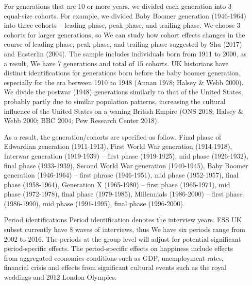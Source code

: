 For generations that are 10 or more years, we divided each generation into 3 equal-size cohorts. For example, we divided Baby Boomer generation (1946-1964) into three cohorts – leading phase, peak phase, and trailing phase. We choose 3 cohorts for larger generations, so We can study how cohort effects changes in the course of leading phase, peak phase, and trailing phase suggested by Shu (2017) and Easterlin (2004). The sample includes individuals born from 1911 to 2000, as a result, We have 7 generations and total of 15 cohorts. UK historians have distinct identifications for generations born before the baby boomer generation, especially for the era between 1910 to 1948 (Annan 1978; Halsey & Webb 2000). We divide the postwar (1948) generations similarly to that of the United States, probably partly due to similar population patterns, increasing the cultural influence of the United States on a waning British Empire (ONS 2018; Halsey & Webb 2000; BBC 2004; Pew Research Center 2018). 

As a result, the generation/cohorts are specified as follow. Final phase of Edwardian generation (1911-1913), First World War generation (1914-1918), Interwar generation (1919-1939) – first phase (1919-1925), mid phase (1926-1932), final phase (1933-1939), Second World War generation (1940-1945),  Baby Boomer generation (1946-1964) – first phrase (1946-1951), mid phase (1952-1957), final phase (1958-1964), Generation X (1965-1980) – first phase (1965-1971), mid phase (1972-1978), final phase (1979-1985), Millennials (1986-2000) – first phase (1986-1990), mid phase (1991-1995), final phase (1996-2000).

Period identifications
Period identification denotes the interview years. ESS UK subset currently have 8 waves of interviews, thus We have six periods range from 2002 to 2016. The periods at the group level will adjust for potential significant period-specific effects. The period-specific effects on happiness include effects from aggregated economics conditions such as GDP, unemployment rates, financial crisis and effects from significant cultural events such as the royal weddings and 2012 London Olympics.

